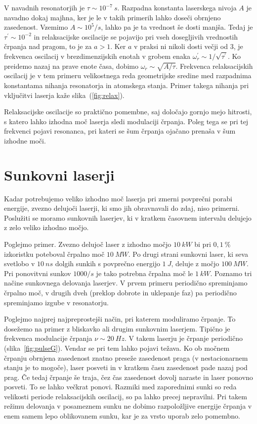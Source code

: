V navadnih resonatorjih je $\tau \sim 10^{-7}~\si{s}$. Razpadna
konstanta laserskega nivoja $A$ je navadno dokaj majhna, ker je le v takih
primerih lahko doseči obrnjeno zasedenost. Vzemimo $A \sim 10^5/\si{s}$,
lahko pa je ta vrednost še dosti manjša. Tedaj je $\tau^{\prime}\sim 10^{-2}$ 
in relaksacijske oscilacije se pojavijo pri vseh dosegljivih vrednostih črpanja 
nad pragom, to je za $a>1$. Ker $a$ v praksi ni nikoli dosti večji od 3, 
je frekvenca oscilacij v brezdimenzijskih enotah v grobem
enaka $\omega^{\prime}_r\sim 1/\sqrt{\tau^{\prime}}$. Ko preidemo
nazaj na prave enote časa, dobimo $\omega_r\sim \sqrt{A/\tau}$. Frekvenca 
relaksacijskih oscilacij je v tem primeru velikostnega reda geometrijske 
sredine med razpadnima konstantama nihanja resonatorja in atomskega stanja. 
Primer takega nihanja pri vključitvi laserja kaže slika~(\ref{fig:relax}).

\begin{remark}
Relaksacijske oscilacije so praktično pomembne, saj določajo gornjo mejo
hitrosti, s katero lahko izhodna moč laserja sledi modulaciji črpanja.
Poleg tega se pri tej frekvenci pojavi resonanca, pri kateri se šum črpanja
ojačano prenaša v šum izhodne moči. 
\end{remark}

\section{Sunkovni laserji}
Kadar potrebujemo veliko izhodno moč laserja pri zmerni povprečni porabi 
energije, zvezno delujoči laserji, ki smo jih obravnavali do zdaj, 
niso primerni. Poslužiti se moramo sunkovnih laserjev, 
ki v kratkem časovnem intervalu 
delujejo z zelo veliko izhodno močjo. 

Poglejmo primer. Zvezno delujoč laser z izhodno močjo $10~\si{kW}$ bi pri
$0,1~\%$ izkoristku poteboval črpalno moč $10~\si{MW}$. Po drugi strani 
sunkovni laser, ki seva svetlobo v $10~\si{ns}$ dolgih sunkih s 
povprečno energijo $1~\si{J}$, deluje z močjo $100~\si{MW}$. Pri 
ponovitvni sunkov $1000/\si{s}$ je tako potrebna črpalna moč le $1~\si{kW}$.
Poznamo tri načine sunkovnega delovanja laserjev. V prvem primeru 
periodično spreminjamo črpalno moč, v drugih dveh (preklop dobrote in 
uklepanje faz) pa periodično spreminjamo izgube v resonatorju. 

Poglejmo najprej najpreprostejši način, pri katerem moduliramo črpanje.
To dosežemo na primer z bliskavko ali drugim sunkovnim laserjem.
Tipično je frekvenca modulacije črpanja $\nu \sim 20~\si{Hz}$.
V takem laserju je črpanje periodično (slika~\ref{fig:pulseG}). Vendar
se pri tem lahko pojavi težava. Ko ob močnem črpanju obrnjena zasedenost znatno
preseže zasedenost praga (v nestacionarnem stanju je to mogoče), laser
posveti in v kratkem času zasedenost pade nazaj pod prag. Če tedaj
črpanje še traja, čez čas zasedenost dovolj naraste in laser
ponovno posveti. To se lahko večkrat ponovi. Razmiki med zaporednimi sunki
so reda velikosti periode relaksacijskih oscilacij, so pa lahko precej
nepravilni. Pri takem režimu delovanja v posameznem sunku ne dobimo
razpoložljive energije črpanja v enem samem lepo oblikovanem sunku, kar
je za vrsto uporab zelo pomembno. 

